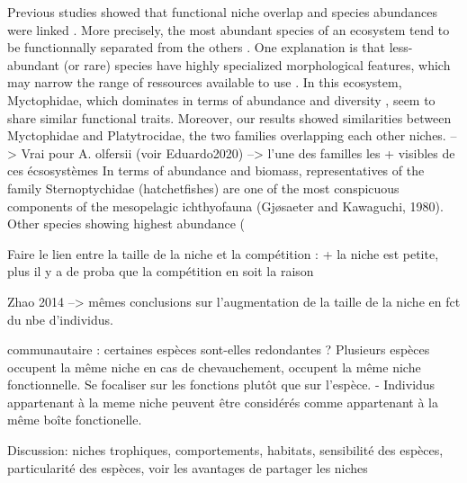 Previous studies showed that functional niche overlap and species abundances were linked \citep{aneeshkumar2017,mason2008}. More precisely, the most abundant species of an ecosystem tend to be functionnally separated from the others \citep{farre2016}. One explanation is that less-abundant (or rare) species have highly specialized morphological features, which may narrow the range of ressources available to use \citep{aneeshkumar2017}. In this ecosystem, Myctophidae, which dominates in terms of abundance and diversity \citep{catul2011,garcia2021}, seem to share similar functional traits. Moreover, our results showed similarities between Myctophidae and Platytrocidae, the two families overlapping each other niches. --> Vrai pour A. olfersii (voir Eduardo2020) --> l'une des familles les + visibles de ces écsosystèmes
In terms of abundance and biomass, representatives of the family
Sternoptychidae (hatchetfishes) are one of the most conspicuous components
of the mesopelagic ichthyofauna (Gjøsaeter and Kawaguchi,
1980).
Other species showing highest abundance (%
\citep{sutton2008}


Faire le lien entre la taille de la niche et la compétition : + la niche est petite, plus il y a de proba que la compétition en soit la raison 

Zhao 2014 --> mêmes conclusions sur l'augmentation de la taille de la niche en fct du nbe d'individus.

communautaire : certaines espèces sont-elles redondantes ? Plusieurs espèces
occupent la même niche en cas de chevauchement, occupent la même niche fonctionnelle. Se focaliser
sur les fonctions plutôt que sur l'espèce. 
		- Individus appartenant à la meme niche peuvent être considérés comme appartenant
à la même boîte fonctionelle. 


Discussion: niches trophiques, comportements, habitats, sensibilité des espèces, 
particularité des espèces, voir les avantages de partager les niches 
